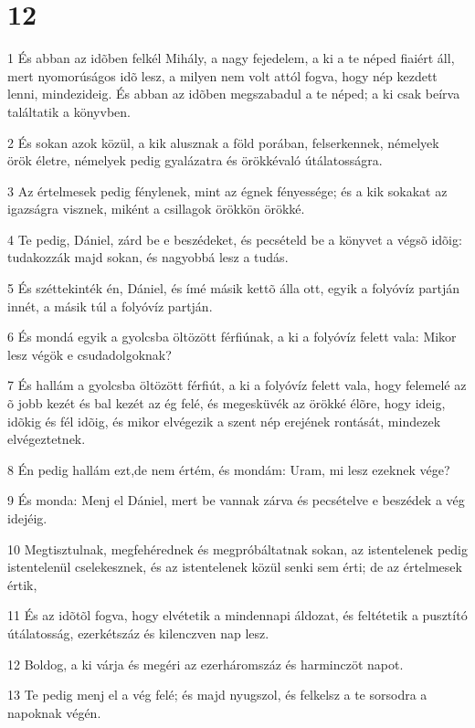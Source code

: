 \chapter{12}

\par 1 És abban az idõben felkél Mihály, a nagy fejedelem, a ki a te néped fiaiért áll, mert nyomorúságos idõ lesz, a milyen nem volt attól fogva, hogy nép kezdett lenni, mindezideig. És abban az idõben megszabadul a te néped; a ki csak beírva találtatik a könyvben.
\par 2 És sokan azok közül, a kik alusznak a föld porában, felserkennek, némelyek örök életre, némelyek pedig gyalázatra és örökkévaló útálatosságra.
\par 3 Az értelmesek pedig fénylenek, mint az égnek fényessége; és a kik sokakat az igazságra visznek, miként a csillagok örökkön örökké.
\par 4 Te pedig, Dániel, zárd be e beszédeket, és pecsételd be a könyvet a végsõ idõig: tudakozzák majd sokan, és nagyobbá lesz a tudás.
\par 5 És széttekinték én, Dániel, és ímé másik kettõ álla ott, egyik a folyóvíz partján innét, a másik túl a folyóvíz partján.
\par 6 És mondá egyik a gyolcsba öltözött férfiúnak, a ki a folyóvíz felett vala: Mikor lesz végök e csudadolgoknak?
\par 7 És hallám a gyolcsba öltözött férfiút, a ki a folyóvíz felett vala, hogy felemelé az õ jobb kezét és bal kezét az ég felé, és megesküvék az örökké élõre, hogy ideig,  idõkig és fél idõig, és mikor elvégezik a szent nép erejének rontását, mindezek elvégeztetnek.
\par 8 Én pedig hallám ezt,de nem értém, és mondám: Uram, mi lesz ezeknek vége?
\par 9 És monda: Menj el Dániel, mert be vannak zárva és pecsételve e beszédek a vég idejéig.
\par 10 Megtisztulnak, megfehérednek és megpróbáltatnak sokan, az istentelenek pedig istentelenül cselekesznek, és az istentelenek közül senki sem érti; de az értelmesek értik,
\par 11 És az idõtõl fogva, hogy elvétetik a mindennapi áldozat, és feltétetik a pusztító útálatosság, ezerkétszáz és kilenczven nap lesz.
\par 12 Boldog, a ki várja és megéri az ezerháromszáz és harminczöt napot.
\par 13 Te pedig menj el a vég felé; és majd nyugszol, és felkelsz a te sorsodra a napoknak végén.


